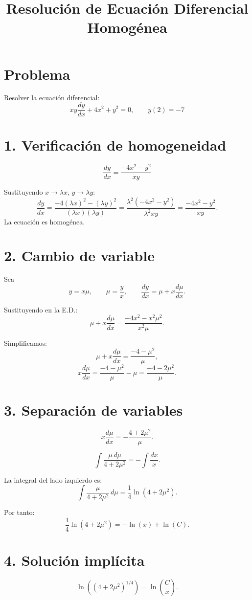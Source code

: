 \documentclass[a4paper,12pt]{article}
\title{Resolución de Ecuación Diferencial Homogénea}
\author{}
\date{}
\begin{document}
\maketitle

\section*{Problema}
Resolver la ecuación diferencial:
\[
xy\frac{dy}{dx} + 4x^{2} + y^{2} = 0, 
\qquad y(2) = -7
\]

\section*{1. Verificación de homogeneidad}
\[
\frac{dy}{dx} = \frac{-4x^{2} - y^{2}}{xy}
\]

Sustituyendo \(x \to \lambda x\), \(y \to \lambda y\):
\[
\frac{dy}{dx} = \frac{-4(\lambda x)^{2} - (\lambda y)^{2}}{(\lambda x)(\lambda y)}
= \frac{\lambda^{2}(-4x^{2} - y^{2})}{\lambda^{2} xy}
= \frac{-4x^{2} - y^{2}}{xy}.
\]
La ecuación es homogénea.

\section*{2. Cambio de variable}
Sea 
\[
y = x\mu, \qquad \mu = \frac{y}{x}, \qquad \frac{dy}{dx} = \mu + x\frac{d\mu}{dx}.
\]

Sustituyendo en la E.D.:
\[
\mu + x\frac{d\mu}{dx} = \frac{-4x^{2} - x^{2}\mu^{2}}{x^{2}\mu}.
\]

Simplificamos:
\[
\mu + x\frac{d\mu}{dx} = \frac{-4 - \mu^{2}}{\mu},
\]
\[
x\frac{d\mu}{dx} = \frac{-4 - \mu^{2}}{\mu} - \mu 
= \frac{-4 - 2\mu^{2}}{\mu}.
\]

\section*{3. Separación de variables}
\[
x\frac{d\mu}{dx} = -\frac{4 + 2\mu^{2}}{\mu}.
\]

\[
\int \frac{\mu \, d\mu}{4 + 2\mu^{2}} = -\int \frac{dx}{x}.
\]

La integral del lado izquierdo es:
\[
\int \frac{\mu}{4 + 2\mu^{2}}\, d\mu 
= \frac{1}{4} \ln(4 + 2\mu^{2}).
\]

Por tanto:
\[
\frac{1}{4}\ln(4 + 2\mu^{2}) = -\ln(x) + \ln(C).
\]

\section*{4. Solución implícita}
\[
\ln\!\left((4+2\mu^{2})^{1/4}\right) = \ln\!\left(\frac{C}{x}\right).
\]
\end{document}
